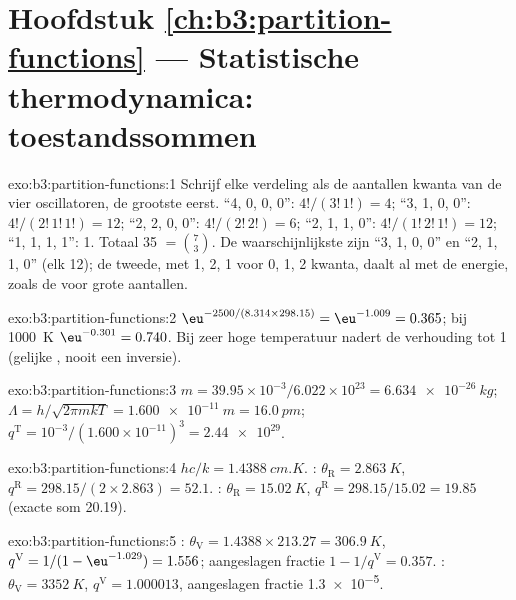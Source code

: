 \section*{Hoofdstuk \ref{ch:b3:partition-functions} --- Statistische thermodynamica: toestandssommen}

\begin{solution}{exo:b3:partition-functions:1}
Schrijf elke verdeling als de aantallen kwanta van de vier oscillatoren,
de grootste eerst. ``4, 0, 0, 0'': $4!/(3!\,1!) = 4$; ``3, 1, 0, 0'': $4!/(2!\,1!\,1!) = 12$; ``2, 2, 0, 0'':
$4!/(2!\,2!) = 6$; ``2, 1, 1, 0'': $4!/(1!\,2!\,1!) = 12$; ``1, 1, 1, 1'': 1. Totaal 35 $= \binom73$.
De waarschijnlijkste zijn ``3, 1, 0, 0'' en ``2, 1, 1, 0'' (elk 12); de
tweede, met  1, 2, 1 voor 0, 1, 2 kwanta, daalt al met de
energie, zoals de  voor grote aantallen.
\end{solution}

\begin{solution}{exo:b3:partition-functions:2}
$\eu^{-2500/(8.314 \times 298.15)} = \eu^{-1.009} = 0.365$; bij \qty{1000}{K} $\eu^{-0.301} = 0.740$.
Bij zeer hoge temperatuur nadert de verhouding tot 1 (gelijke ,
nooit een inversie).
\end{solution}

\begin{solution}{exo:b3:partition-functions:3}
$m = 39.95\times10^{-3}/6.022\times10^{23} = \qty{6.634e-26}{kg}$; $\Lambda = h/\sqrt{2\pi mkT} =
\qty{1.600e-11}{m} = \qty{16.0}{pm}$; $q^{\mathrm T} = 10^{-3}/(1.600\times10^{-11})^3 = \num{2.44e29}$.
\end{solution}

\begin{solution}{exo:b3:partition-functions:4}
$hc/k = \qty{1.4388}{cm.K}$. : $\theta_{\mathrm R} = \qty{2.863}{K}$, $q^{\mathrm R} = 298.15/(2 \times 2.863) = 52.1$.
: $\theta_{\mathrm R} = \qty{15.02}{K}$, $q^{\mathrm R} = 298.15/15.02 = 19.85$ (exacte som 20.19).
\end{solution}

\begin{solution}{exo:b3:partition-functions:5}
: $\theta_{\mathrm V} = 1.4388 \times 213.27 = \qty{306.9}{K}$, $q^{\mathrm V} = 1/(1 - \eu^{-1.029}) = 1.556$;
aangeslagen fractie $1 - 1/q^{\mathrm V} = 0.357$. : $\theta_{\mathrm V} = \qty{3352}{K}$, $q^{\mathrm V} = 1.000013$,
aangeslagen fractie \num{1.3e-5}.
\end{solution}

